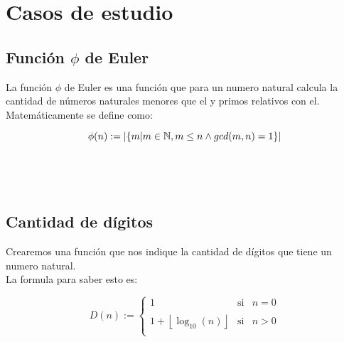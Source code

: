 
\titlespacing{\subsection}{0pt}{10pt}{0pt}

\chapter{Casos de estudio}
   \section{Función $\phi$ de Euler}
      La función $\phi$ de Euler es una función que para un numero natural calcula la cantidad de números naturales menores que el y primos relativos con el.
      \\
      
      Matemáticamente se define como:
      
      $$\phi(n) := |\{m | m \in \mathbb{N}, m \leq n \wedge gcd(m, n) = 1\}|$$
      
      \begin{fxcode}
         \\
      \end{fxcode}
      
      \begin{fxcode}
         \\
      \end{fxcode}
      
   \section{Cantidad de dígitos}
      Crearemos una función que nos indique la cantidad de dígitos que tiene un numero natural.
      \\
      
      La formula para saber esto es:
      
      \[D(n) := \left\{ \begin{array}{rcl}
            1 & \mbox{si} & n = 0\\
            & & \\
            1 + \left\lfloor \log_{10}(n)\right\rfloor &  \mbox{si} & n > 0\\
         \end{array}
      \right. \]
      

